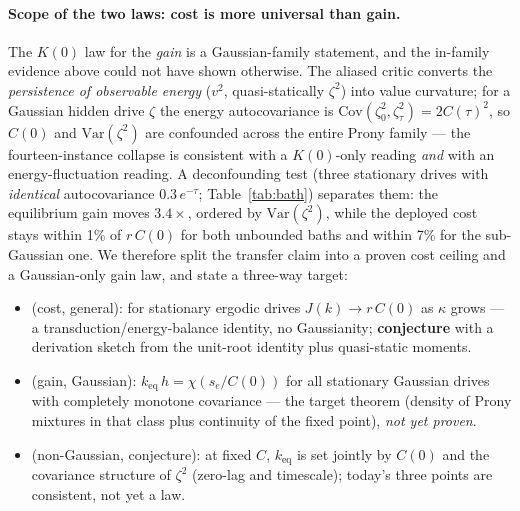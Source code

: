 \documentclass[11pt]{article}
\newcommand{\keq}{k_{\mathrm{eq}}}
\begin{document}
\paragraph{Scope of the two laws: cost is more universal than gain.}\label{sec:scope}
The $K(0)$ law for the \emph{gain} is a Gaussian-family statement, and the in-family evidence
above could not have shown otherwise. The aliased critic converts the \emph{persistence of
observable energy} ($v^2$, quasi-statically $\zeta^2$) into value curvature; for a Gaussian
hidden drive $\zeta$ the energy autocovariance is $\mathrm{Cov}(\zeta_0^2,\zeta_\tau^2)
= 2C(\tau)^2$, so $C(0)$ and $\mathrm{Var}(\zeta^2)$ are confounded across the entire Prony
family --- the fourteen-instance collapse is consistent with a $K(0)$-only reading \emph{and}
with an energy-fluctuation reading. A deconfounding test (three stationary drives with
\emph{identical} autocovariance $0.3\,e^{-\tau}$; Table~\ref{tab:bath}) separates them: the
equilibrium gain moves $3.4\times$, ordered by $\mathrm{Var}(\zeta^2)$, while the deployed cost
stays within 1\% of $r\,C(0)$ for both unbounded baths and within 7\% for the sub-Gaussian one.
We therefore split the transfer claim into a proven cost ceiling and a Gaussian-only gain law,
and state a three-way target:
\begin{itemize}[leftmargin=1.4em,itemsep=1pt]
\item[\textbf{A1}] (cost, general): for stationary ergodic drives $J(k)\to r\,C(0)$ as $\kappa$
grows --- a transduction/energy-balance identity, no Gaussianity; \textbf{conjecture} with a
derivation sketch from the unit-root identity plus quasi-static moments.
\item[\textbf{A2}] (gain, Gaussian): $\keq\,h = \chi(s_e/C(0))$ for all stationary Gaussian
drives with completely monotone covariance --- the target theorem (density of Prony mixtures in
that class plus continuity of the fixed point), \emph{not yet proven}.
\item[\textbf{A3}] (non-Gaussian, conjecture): at fixed $C$, $\keq$ is set jointly by $C(0)$
and the covariance structure of $\zeta^2$ (zero-lag and timescale); today's three points are
consistent, not yet a law.
\end{itemize}
\end{document}
